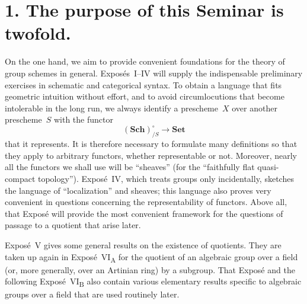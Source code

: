 \section*{1. The purpose of this Seminar is twofold.}

On the one hand, we aim to provide convenient foundations for the theory of group
schemes in general.  Expos\'es~I--IV will supply the indispensable preliminary
exercises in schematic and categorical syntax.  To obtain a language that fits
geometric intuition without effort, and to avoid circumlocutions that become
intolerable in the long run, we always identify a prescheme~$X$ over another
prescheme~$S$ with the functor
\[
  (\mathbf{Sch})_{/S}^{\circ}\longrightarrow \mathbf{Set}
\]
that it represents.  It is therefore
necessary to formulate many definitions so that they apply to arbitrary functors,
whether representable or not.  Moreover, nearly all the functors we shall use will
be ``sheaves'' (for the ``faithfully flat quasi-compact topology'').  Expos\'e~IV,
which treats groups only incidentally, sketches the language of ``localization'' and
sheaves; this language also proves very convenient in questions concerning the
representability of functors.  Above all, that Expos\'e will provide the most
convenient framework for the questions of passage to a quotient that arise later.

Expos\'e~V gives some general results on the existence of quotients.  They are taken
up again in Expos\'e~VI\textsubscript{A} for the quotient of an algebraic group over
a field (or, more generally, over an Artinian ring) by a
subgroup.  That Expos\'e and the following
Expos\'e~VI\textsubscript{B} also contain various elementary results specific to
algebraic groups over a field that are used routinely later.

